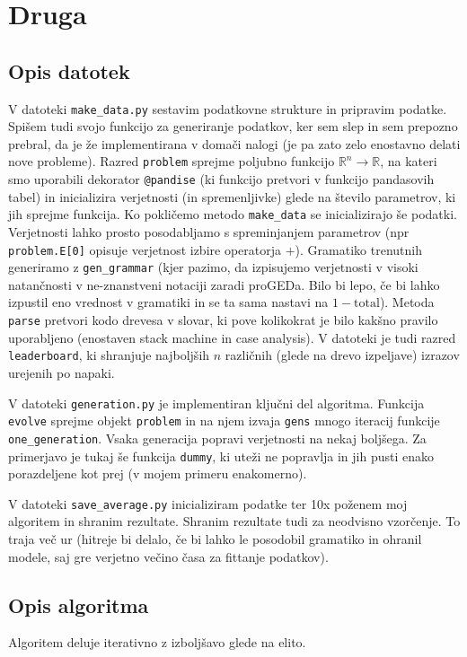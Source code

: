 \documentclass{article}
\begin{document}
\section{Druga} 
\subsection*{Opis datotek} V datoteki \verb|make_data.py| sestavim podatkovne strukture in pripravim podatke. Spišem tudi svojo funkcijo za generiranje podatkov, ker sem slep in sem prepozno prebral, da je že implementirana v domači nalogi (je pa zato zelo enostavno delati nove probleme). Razred \verb|problem| sprejme poljubno funkcijo \(\mathbb R^n\to \mathbb R\), na kateri smo uporabili dekorator \verb|@pandise| (ki funkcijo pretvori v funkcijo pandasovih tabel) in inicializira verjetnosti (in spremenljivke) glede na število parametrov, ki jih sprejme funkcija. Ko pokličemo metodo \verb|make_data| se inicializirajo še podatki. Verjetnosti lahko prosto posodabljamo s spreminjanjem parametrov (npr \verb|problem.E[0]| opisuje verjetnost izbire operatorja \(+\)). Gramatiko trenutnih generiramo z \verb|gen_grammar| (kjer pazimo, da izpisujemo verjetnosti v visoki natančnosti v ne-znanstveni notaciji zaradi proGEDa. Bilo bi lepo, če bi lahko izpustil eno vrednost v gramatiki in se ta sama nastavi na \(1-\text{total}\)). Metoda \verb|parse| pretvori kodo drevesa v slovar, ki pove kolikokrat je bilo kakšno pravilo uporabljeno (enostaven stack machine in case analysis). V datoteki je tudi razred \verb|leaderboard|, ki shranjuje najboljših \(n\) različnih (glede na drevo izpeljave) izrazov urejenih po napaki.

V datoteki \verb|generation.py| je implementiran ključni del algoritma. Funkcija \verb|evolve| sprejme objekt \verb|problem| in na njem izvaja \verb|gens| mnogo iteracij funkcije \verb|one_generation|. Vsaka generacija popravi verjetnosti na nekaj boljšega. Za primerjavo je tukaj še funkcija \verb|dummy|, ki uteži ne popravlja in jih pusti enako porazdeljene kot prej (v mojem primeru enakomerno).

V datoteki \verb|save_average.py| inicializiram podatke ter 10x poženem moj algoritem in shranim rezultate. Shranim rezultate tudi za neodvisno vzorčenje. To traja več ur (hitreje bi delalo, če bi lahko le posodobil gramatiko in ohranil modele, saj gre verjetno večino časa za fittanje podatkov).

\subsection*{Opis algoritma} Algoritem deluje iterativno z izboljšavo glede na elito.
\end{document}
